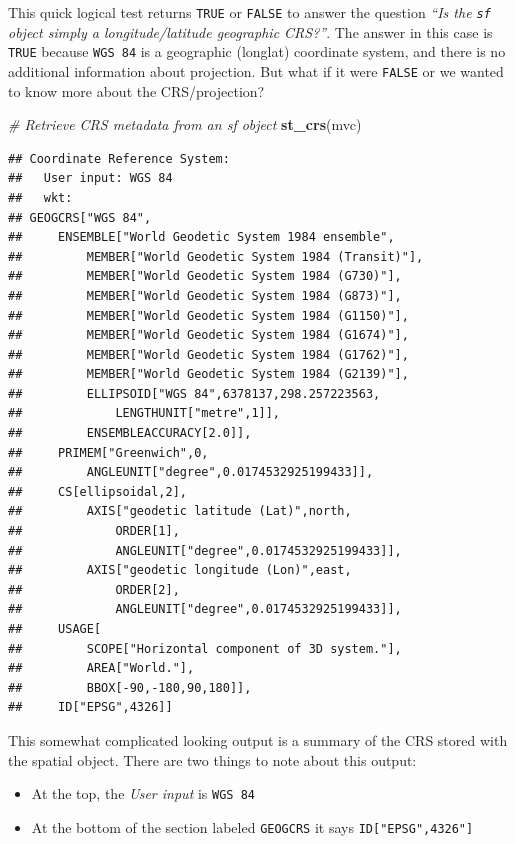 \documentclass[
]{book}
\newenvironment{Shaded}{\begin{snugshade}}{\end{snugshade}}
\newcommand{\CommentTok}[1]{\textcolor[rgb]{0.56,0.35,0.01}{\textit{#1}}}
\newcommand{\FunctionTok}[1]{\textcolor[rgb]{0.13,0.29,0.53}{\textbf{#1}}}
\newcommand{\NormalTok}[1]{#1}
\providecommand{\tightlist}{%
  \setlength{\itemsep}{0pt}\setlength{\parskip}{0pt}}
\begin{document}
This quick logical test returns \texttt{TRUE} or \texttt{FALSE} to answer the question \emph{``Is the \texttt{sf} object simply a longitude/latitude geographic CRS?''}. The answer in this case is \texttt{TRUE} because \texttt{WGS\ 84} is a geographic (longlat) coordinate system, and there is no additional information about projection. But what if it were \texttt{FALSE} or we wanted to know more about the CRS/projection?

\begin{Shaded}
\begin{Highlighting}[]
\CommentTok{\# Retrieve CRS metadata from an sf object}
\FunctionTok{st\_crs}\NormalTok{(mvc)}
\end{Highlighting}
\end{Shaded}

\begin{verbatim}
## Coordinate Reference System:
##   User input: WGS 84 
##   wkt:
## GEOGCRS["WGS 84",
##     ENSEMBLE["World Geodetic System 1984 ensemble",
##         MEMBER["World Geodetic System 1984 (Transit)"],
##         MEMBER["World Geodetic System 1984 (G730)"],
##         MEMBER["World Geodetic System 1984 (G873)"],
##         MEMBER["World Geodetic System 1984 (G1150)"],
##         MEMBER["World Geodetic System 1984 (G1674)"],
##         MEMBER["World Geodetic System 1984 (G1762)"],
##         MEMBER["World Geodetic System 1984 (G2139)"],
##         ELLIPSOID["WGS 84",6378137,298.257223563,
##             LENGTHUNIT["metre",1]],
##         ENSEMBLEACCURACY[2.0]],
##     PRIMEM["Greenwich",0,
##         ANGLEUNIT["degree",0.0174532925199433]],
##     CS[ellipsoidal,2],
##         AXIS["geodetic latitude (Lat)",north,
##             ORDER[1],
##             ANGLEUNIT["degree",0.0174532925199433]],
##         AXIS["geodetic longitude (Lon)",east,
##             ORDER[2],
##             ANGLEUNIT["degree",0.0174532925199433]],
##     USAGE[
##         SCOPE["Horizontal component of 3D system."],
##         AREA["World."],
##         BBOX[-90,-180,90,180]],
##     ID["EPSG",4326]]
\end{verbatim}

This somewhat complicated looking output is a summary of the CRS stored with the spatial object. There are two things to note about this output:

\begin{itemize}
\tightlist
\item
  At the top, the \emph{User input} is \texttt{WGS\ 84}
\item
  At the bottom of the section labeled \texttt{GEOGCRS} it says \texttt{ID{[}"EPSG",4326"{]}}
\end{itemize}
\end{document}
